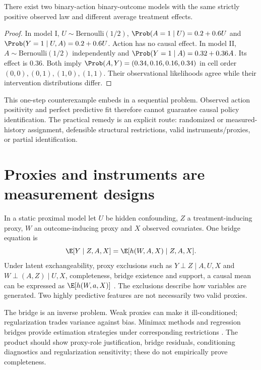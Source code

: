 \begin{proposition}
There exist two binary-action binary-outcome models with the same strictly
positive observed law and different average treatment effects.
\end{proposition}
\begin{proof}
In model I, $U\sim\mathrm{Bernoulli}(1/2)$,
$\Prob(A=1\mid U)=0.2+0.6U$ and
$\Prob(Y=1\mid U,A)=0.2+0.6U$. Action has no causal effect.
In model II, $A\sim\mathrm{Bernoulli}(1/2)$ independently and
$\Prob(Y=1\mid A)=0.32+0.36A$. Its effect is $0.36$.
Both imply
$\Prob(A,Y)=(0.34,0.16,0.16,0.34)$ in cell order
$(0,0),(0,1),(1,0),(1,1)$. Their observational likelihoods agree
while their intervention distributions differ.
\end{proof}

This one-step counterexample embeds in a sequential problem. Observed
action positivity and perfect predictive fit therefore cannot guarantee
causal policy identification. The practical remedy is an explicit route:
randomized or measured-history assignment, defensible structural restrictions,
valid instruments/proxies, or partial identification.

\section{Proxies and instruments are measurement designs}
In a static proximal model let $U$ be hidden confounding, $Z$ a
treatment-inducing proxy, $W$ an outcome-inducing proxy and $X$ observed
covariates. One bridge equation is
\begin{equation}
 \E[Y\mid Z,A,X]=\E[h(W,A,X)\mid Z,A,X].
 \label{eq:bridge}
\end{equation}
Under latent exchangeability, proxy exclusions such as
$Y\perp Z\mid A,U,X$ and $W\perp(A,Z)\mid U,X$, completeness,
bridge existence and support, a causal mean can be expressed as
$\E[h(W,a,X)]$ \citep{miao2018,proximal2020}.
The exclusions describe how variables are generated. Two highly predictive
features are not necessarily two valid proxies.

The bridge is an inverse problem. Weak proxies can make it ill-conditioned;
regularization trades variance against bias. Minimax methods and regression
bridges provide estimation strategies under corresponding restrictions
\citep{ghassami2022,proxreg2024}. The product should show proxy-role
justification, bridge residuals, conditioning diagnostics and regularization
sensitivity; these do not empirically prove completeness.

